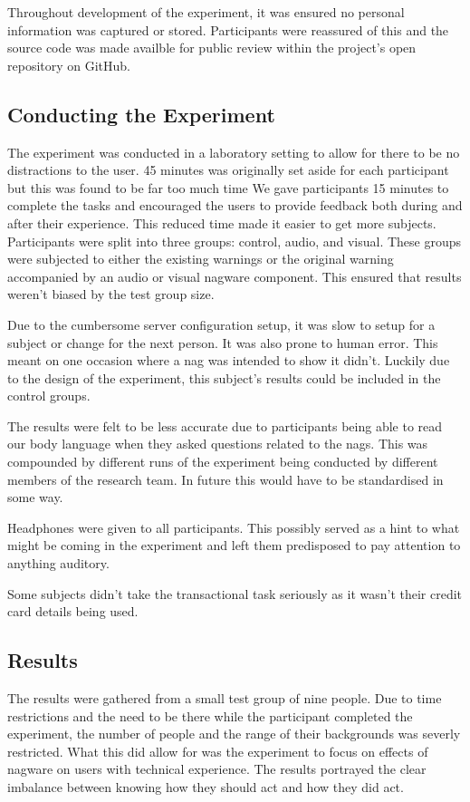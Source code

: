 \documentclass{mpaper}
\begin{document}
Throughout development of the experiment, it was ensured no personal information was captured or stored. Participants were reassured of this and the source code was made availble for public review within the project's open repository on GitHub.

\subsection{Conducting the Experiment}

The experiment was conducted in a laboratory setting to allow for there to be no distractions to the user. 45 minutes was originally set aside for each participant but this was found to be far too much time We gave participants 15 minutes to complete the tasks and encouraged the users to provide feedback both during and after their experience. This reduced time made it easier to get more subjects. Participants were split into three groups: control, audio, and visual. These groups were subjected to either the existing warnings or the original warning accompanied by an audio or visual nagware component. This ensured that results weren't biased by the test group size. 

Due to the cumbersome server configuration setup, it was slow to setup for a subject or change for the next person. It was also prone to human error. This meant on one occasion where a nag was intended to show it didn't. Luckily due to the design of the experiment, this subject's results could be included in the control groups.

The results were felt to be less accurate due to participants being able to read our body language when they asked questions related to the nags. This was compounded by different runs of the experiment being conducted by different members of the research team. In future this would have to be standardised in some way.

Headphones were given to all participants. This possibly served as a hint to what might be coming in the experiment and left them predisposed to pay attention to anything auditory.

Some subjects didn't take the transactional task seriously as it wasn't their credit card details being used. 

\subsection{Results}
The results were gathered from a small test group of nine people. Due to time restrictions and the need to be there while the participant completed the experiment, the number of people and the range of their backgrounds was severly restricted. What this did allow for was the experiment to focus on effects of nagware on users with technical experience. The results portrayed the clear imbalance between knowing how they should act and how they did act.
\end{document}
